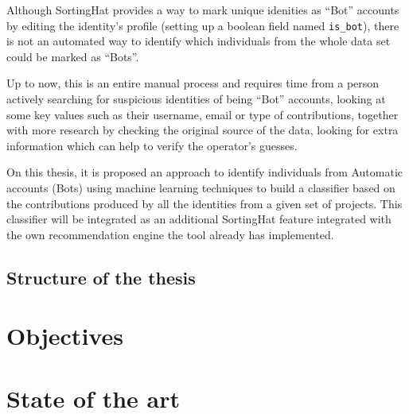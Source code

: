 \documentclass[a4paper, 12pt]{book}
\begin{document}
Although SortingHat provides a way to mark unique idenities as “Bot” accounts by editing the identity’s profile (setting up a boolean field named \texttt{is\_bot}), there is not an automated way to identify which individuals from the whole data set could be marked as “Bots”.

Up to now, this is an entire manual process and requires time from a person actively searching for suspicious identities of being “Bot” accounts, looking at some key values such as their username, email or type of contributions, together with more research by checking the original source of the data, looking for extra information which can help to verify the operator’s guesses.

On this thesis, it is proposed an approach to identify individuals from Automatic accounts (Bots) using machine learning techniques to build a classifier based on the contributions produced by all the identities from a given set of projects. This classifier will be integrated as an additional SortingHat feature integrated with the own recommendation engine the tool already has implemented.

\section{Structure of the thesis}
\label{sec:structure}



\cleardoublepage
\chapter{Objectives}
\label{sec:objectives}


\cleardoublepage
\chapter{State of the art}
\label{sec:state-art}
\end{document}
